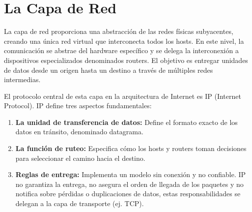 \section{La Capa de Red}

La capa de red proporciona una abstracción de las redes físicas subyacentes, creando una única red virtual que interconecta todos los hosts. En este nivel, la comunicación se abstrae del hardware específico y se delega la interconexión a dispositivos especializados denominados routers. El objetivo es entregar unidades de datos desde un origen hasta un destino a través de múltiples redes intermedias.

El protocolo central de esta capa en la arquitectura de Internet es IP (Internet Protocol). IP define tres aspectos fundamentales:
\begin{enumerate}
    \item \textbf{La unidad de transferencia de datos:} Define el formato exacto de los datos en tránsito, denominado datagrama.
    \item \textbf{La función de ruteo:} Especifica cómo los hosts y routers toman decisiones para seleccionar el camino hacia el destino.
    \item \textbf{Reglas de entrega:} Implementa un modelo sin conexión y no confiable. IP no garantiza la entrega, no asegura el orden de llegada de los paquetes y no notifica sobre pérdidas o duplicaciones de datos, estas responsabilidades se delegan a la capa de transporte (ej. TCP).
\end{enumerate}

